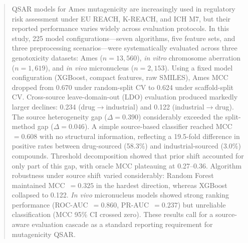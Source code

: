 \begin{abstract}
QSAR models for Ames mutagenicity are increasingly used in regulatory risk assessment under EU REACH, K-REACH, and ICH M7, 
but their reported performance varies widely across evaluation protocols.\cite{Honma_2019,Furuhama_2023,Wu_MoleculeNet_2018} 
In this study, 225 model configurations---seven algorithms, five feature sets, and three preprocessing 
scenarios---were systematically evaluated across three genotoxicity datasets: Ames 
($n = 13{,}560$), \textit{in vitro} chromosome aberration ($n = 1{,}619$), and \textit{in vivo} micronucleus 
($n = 2{,}153$). Using a fixed model configuration (XGBoost, compact features, raw SMILES), 
Ames MCC dropped from 0.670 under random-split CV to 0.624 under scaffold-split CV. 
Cross-source leave-domain-out (LDO) evaluation produced markedly larger declines: 0.234 
(drug$\to$industrial) and 0.122 (industrial$\to$drug). The source heterogeneity gap 
($\Delta = 0.390$) considerably exceeded the split-method gap ($\Delta = 0.046$). A simple 
source-based classifier reached MCC~$= 0.608$ with no structural information, reflecting a 
19.5-fold difference in positive rates between drug-sourced (58.3\%) and industrial-sourced 
(3.0\%) compounds. Threshold decomposition showed that prior shift accounted for only part 
of this gap, with oracle MCC plateauing at 0.27--0.36. Algorithm robustness under source 
shift varied considerably: Random Forest maintained MCC~$= 0.325$ in the hardest direction, 
whereas XGBoost collapsed to 0.122. \textit{In vivo} micronucleus models showed strong ranking 
performance (ROC-AUC~$= 0.860$, PR-AUC~$= 0.237$) but unreliable classification (MCC 
95\% CI crossed zero). These results call for a source-aware evaluation cascade as a 
standard reporting requirement for mutagenicity QSAR.
\end{abstract}
